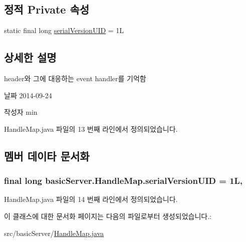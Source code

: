\subsection*{정적 Private 속성}
\begin{DoxyCompactItemize}
\item 
static final long \hyperlink{classbasic_server_1_1_handle_map_ac3933c5d00781beb6cf93b4056f71cd4}{serial\+Version\+U\+I\+D} = 1\+L
\end{DoxyCompactItemize}


\subsection{상세한 설명}
header와 그에 대응하는 event handler를 기억함 

\begin{DoxyDate}{날짜}
2014-\/09-\/24 
\end{DoxyDate}
\begin{DoxyAuthor}{작성자}
min 
\end{DoxyAuthor}


Handle\+Map.\+java 파일의 13 번째 라인에서 정의되었습니다.



\subsection{멤버 데이타 문서화}
\hypertarget{classbasic_server_1_1_handle_map_ac3933c5d00781beb6cf93b4056f71cd4}{
\subsubsection[{serial\+Version\+U\+I\+D}]{\setlength{\rightskip}{0pt plus 5cm}final long basic\+Server.\+Handle\+Map.\+serial\+Version\+U\+I\+D = 1\+L\hspace{0.3cm}{\ttfamily [static]}, {\ttfamily [private]}}}\label{classbasic_server_1_1_handle_map_ac3933c5d00781beb6cf93b4056f71cd4}


Handle\+Map.\+java 파일의 14 번째 라인에서 정의되었습니다.



이 클래스에 대한 문서화 페이지는 다음의 파일로부터 생성되었습니다.\+:\begin{DoxyCompactItemize}
\item 
src/basic\+Server/\hyperlink{_handle_map_8java}{Handle\+Map.\+java}\end{DoxyCompactItemize}
